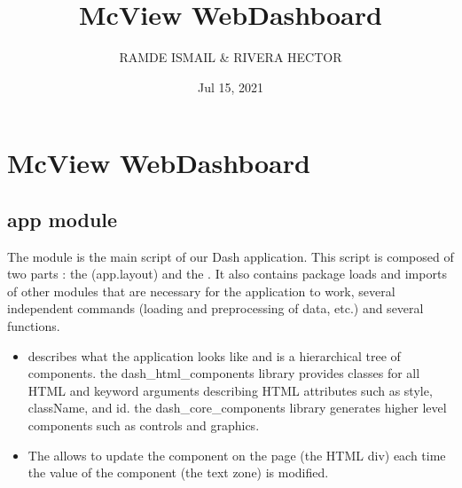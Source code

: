 \documentclass[letterpaper,10pt,english]{sphinxmanual}
\title{McView WebDashboard}
\date{Jul 15, 2021}
\author{RAMDE ISMAIL \& RIVERA HECTOR}
\begin{document}
\pagestyle{empty}
\sphinxmaketitle
\pagestyle{plain}
\sphinxtableofcontents
\pagestyle{normal}
\label{\detokenize{index::doc}}



\chapter{McView WebDashboard}
\label{\detokenize{modules:mcview-webdashboard}}\label{\detokenize{modules::doc}}

\section{app module}
\label{\detokenize{app:app-module}}\label{\detokenize{app::doc}}
\sphinxAtStartPar
The  module is the main script of our Dash application. This script is composed of two parts : the  (app.layout) and the .
It also contains package loads and imports of other modules that are necessary for the application to work, several independent commands (loading and preprocessing of data, etc.) and several functions.
\begin{itemize}
\item {} 
\sphinxAtStartPar
{} describes what the application looks like and is a hierarchical tree of components. the dash\_html\_components library provides classes for all HTML and keyword arguments describing HTML attributes such as style, className, and id. the dash\_core\_components library generates higher level components such as controls and graphics.

\item {} 
\sphinxAtStartPar
The  allows to update the  component on the page (the HTML div) each time the value of the  component (the text zone) is modified.

\end{itemize}
\end{document}
